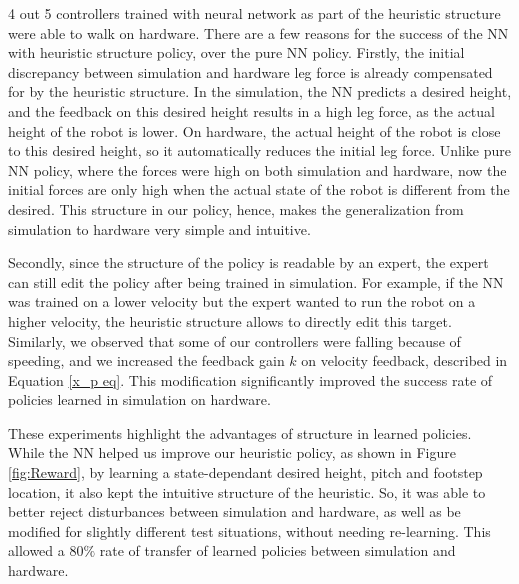 4 out 5 controllers trained with neural network as part of the heuristic structure were able to walk on hardware. There are a few reasons for the success of the NN with heuristic structure policy, over the pure NN policy. Firstly, the initial discrepancy between simulation and hardware leg force is already compensated for by the heuristic structure. In the simulation, the NN predicts a desired height, and the feedback on this desired height results in a high leg force, as the actual height of the robot is lower. On hardware, the actual height of the robot is close to this desired height, so it automatically reduces the initial leg force. Unlike pure NN policy, where the forces were high on both simulation and hardware, now the initial forces are only high when the actual state of the robot is different from the desired. This structure in our policy, hence, makes the generalization from simulation to hardware very simple and intuitive.

Secondly, since the structure of the policy is readable by an expert, the expert can still edit the policy after being trained in simulation. For example, if the NN was trained on a lower velocity but the expert wanted to run the robot on a higher velocity, the heuristic structure allows to directly edit this target. Similarly, we observed that some of our controllers were falling because of speeding, and we increased the feedback gain $k$ on velocity feedback, described in Equation \ref{x_p eq}. This modification significantly improved the success rate of policies learned in simulation on hardware.

These experiments highlight the advantages of structure in learned policies. While the NN helped us improve our heuristic policy, as shown in Figure \ref{fig:Reward}, by learning a state-dependant desired height, pitch and footstep location, it also kept the intuitive structure of the heuristic. So, it was able to better reject disturbances between simulation and hardware, as well as be modified for slightly different test situations, without needing re-learning. This allowed a \textbf{$80\%$} rate of transfer of learned policies between simulation and hardware.
